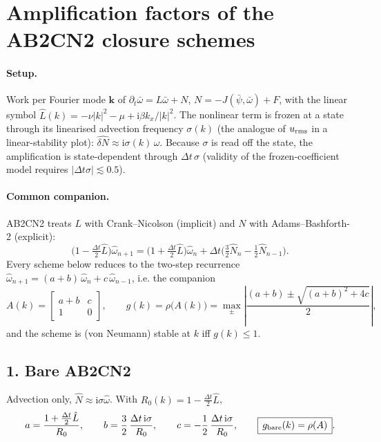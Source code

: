 \documentclass[11pt]{article}
\newcommand{\ii}{\mathrm{i}}
\newcommand{\dt}{\Delta t}
\newcommand{\Lhat}{\hat{L}}
\newcommand{\wh}{\hat{\omega}}
\begin{document}
\section*{Amplification factors of the AB2CN2 closure schemes}

\paragraph{Setup.} Work per Fourier mode $\bm{k}$ of $\partial_t\bar\omega = L\bar\omega + N$,
$N=-J(\bar\psi,\bar\omega)+F$, with the linear symbol
$\Lhat(k) = -\nu|k|^2 - \mu + \ii\beta k_x/|k|^2$. The nonlinear term is frozen at a
state through its linearised advection frequency $\sigma(k)$ (the analogue of
$u_{\rm rms}$ in a linear-stability plot): $\widehat{\delta N}\approx \ii\sigma(k)\,\wh$.
Because $\sigma$ is read off the state, the amplification is state-dependent through
$\dt\,\sigma$ (validity of the frozen-coefficient model requires $|\dt\sigma|\lesssim 0.5$).

\paragraph{Common companion.} AB2CN2 treats $L$ with Crank--Nicolson (implicit) and
$N$ with Adams--Bashforth-2 (explicit):
\begin{equation}
  \Big(1-\tfrac{\dt}{2}\Lhat\Big)\wh_{n+1}
   = \Big(1+\tfrac{\dt}{2}\Lhat\Big)\wh_n
   + \dt\Big(\tfrac{3}{2}\widehat{N}_n-\tfrac{1}{2}\widehat{N}_{n-1}\Big).
  \label{eq:ab2cn2}
\end{equation}
Every scheme below reduces to the two-step recurrence
$\wh_{n+1} = (a+b)\,\wh_n + c\,\wh_{n-1}$, i.e. the companion
\begin{equation}
  A(k)=\begin{bmatrix} a+b & c \\ 1 & 0\end{bmatrix},\qquad
  g(k)=\rho\big(A(k)\big)=\max_{\pm}\left|\frac{(a+b)\pm\sqrt{(a+b)^2+4c}}{2}\right|,
  \label{eq:companion}
\end{equation}
and the scheme is (von Neumann) stable at $k$ iff $g(k)\le 1$.

\subsection*{1. Bare AB2CN2}
Advection only, $\widehat N\approx\ii\sigma\wh$. With $R_0(k)=1-\tfrac{\dt}{2}\Lhat$,
\begin{equation}
  a=\frac{1+\tfrac{\dt}{2}\Lhat}{R_0},\qquad
  b=\frac{3}{2}\,\frac{\dt\,\ii\sigma}{R_0},\qquad
  c=-\frac{1}{2}\,\frac{\dt\,\ii\sigma}{R_0},
  \qquad\boxed{\,g_{\rm bare}(k)=\rho(A)\,}.
  \label{eq:bare}
\end{equation}
\end{document}
